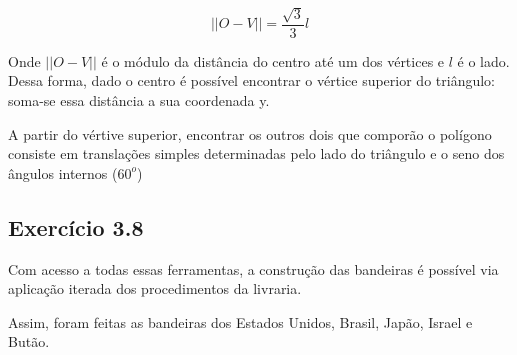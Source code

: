 \documentclass[12pt, a4paper, twoside]{article}
\begin{document}
$$||O-V|| = \frac{\sqrt{3}}{3}l $$

Onde $||O-V||$ é o módulo da distância do centro até um dos vértices e $l$ é o lado. Dessa forma, dado o centro é possível encontrar o vértice superior do triângulo: soma-se essa distância a sua coordenada y. 

A partir do vértive superior, encontrar os outros dois que comporão o polígono consiste em translações simples determinadas pelo lado do triângulo e o seno dos ângulos internos ($60^o$)

\subsection{Exercício 3.8}

Com acesso a todas essas ferramentas, a construção das bandeiras é possível via aplicação iterada dos procedimentos da livraria.

Assim, foram feitas as bandeiras dos Estados Unidos, Brasil, Japão, Israel e Butão.
\end{document}
